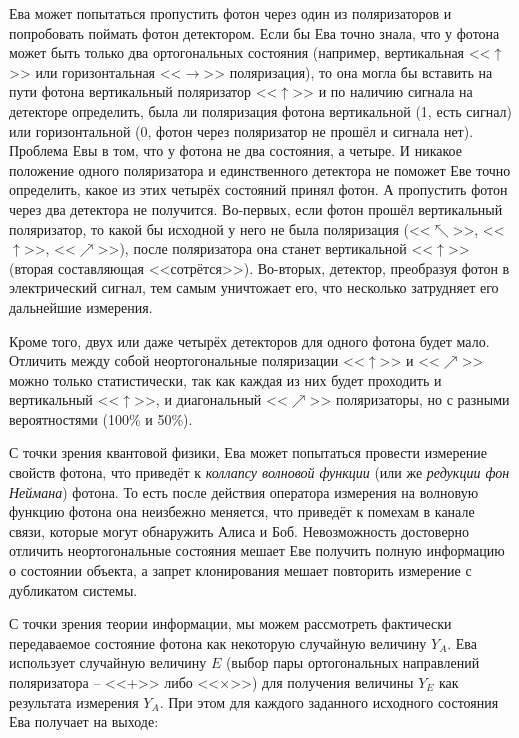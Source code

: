 Ева может попытаться пропустить фотон через один из поляризаторов и попробовать поймать фотон детектором. Если бы Ева точно знала, что у фотона может быть только два ортогональных состояния (например, вертикальная <<$\uparrow$>> или горизонтальная <<$\rightarrow$>> поляризация), то она могла бы вставить на пути фотона вертикальный поляризатор <<$\uparrow$>> и по наличию сигнала на детекторе определить, была ли поляризация фотона вертикальной (1, есть сигнал) или горизонтальной (0, фотон через поляризатор не прошёл и сигнала нет). Проблема Евы в том, что у фотона не два состояния, а четыре. И никакое положение одного поляризатора и единственного детектора не поможет Еве точно определить, какое из этих четырёх состояний принял фотон. А пропустить фотон через два детектора не получится. Во-первых, если фотон прошёл вертикальный  поляризатор, то какой бы исходной у него не была поляризация (<<$\nwarrow$>>, <<$\uparrow$>>, <<$\nearrow$>>), после поляризатора она станет вертикальной <<$\uparrow$>> (вторая составляющая <<сотрётся>>). Во-вторых, детектор, преобразуя фотон в электрический сигнал, тем самым уничтожает его, что несколько затрудняет его дальнейшие измерения.

Кроме того, двух или даже четырёх детекторов для одного фотона будет мало. Отличить между собой неортогональные поляризации <<$\uparrow$>> и <<$\nearrow$>> можно только статистически, так как каждая из них будет проходить и вертикальный <<$\uparrow$>>, и диагональный <<$\nearrow$>> поляризаторы, но с разными вероятностями (100\% и 50\%).

С точки зрения квантовой физики, Ева может попытаться провести измерение свойств фотона, что приведёт к \emph{коллапсу волновой функции} (или же \emph{редукции фон Неймана}) фотона. То есть после действия оператора измерения на волновую функцию фотона она неизбежно меняется, что приведёт к помехам в канале связи, которые могут обнаружить Алиса и Боб. Невозможность достоверно отличить неортогональные состояния мешает Еве получить полную информацию о состоянии объекта, а запрет клонирования мешает повторить измерение с дубликатом системы.

С точки зрения теории информации, мы можем рассмотреть фактически передаваемое состояние фотона как некоторую случайную величину $Y_A$. Ева использует случайную величину $E$ (выбор пары ортогональных направлений поляризатора – <<+>> либо <<×>>) для получения величины $Y_E$ как результата измерения $Y_A$. При этом для каждого заданного исходного состояния Ева получает на выходе:

